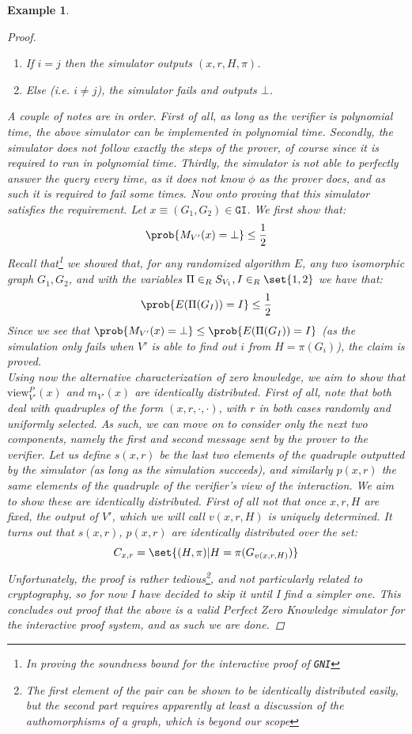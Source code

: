\documentclass{article}
\newtheorem{example}{Example}
\begin{document}
\begin{example}
\begin{proof}
\begin{enumerate}
            \item If $i = j$ then the simulator outputs $(x, r, H, \pi)$.
            \item Else (i.e. $i \neq j$), the simulator fails and outputs $\bot$.
        \end{enumerate}
        A couple of notes are in order. First of all, as long as the verifier is polynomial time, the above simulator can be implemented in polynomial time.
        Secondly, the simulator does not follow exactly the steps of the prover, of course since it is required to run in polynomial time.
        Thirdly, the simulator is not able to perfectly answer the query every time, as it does not know $\phi$ as the prover does, and as such it is required to fail some times.
        Now onto proving that this simulator satisfies the requirement.
        Let $x \equiv (G_1, G_2) \in \texttt{GI}$.
        We first show that:
        \[ \prob{M_{V'}(x) = \bot} \leq \frac{1}{2} \]
        Recall that\footnote{In proving the soundness bound for the interactive proof of \texttt{GNI}} we showed that, for any randomized algorithm $E$, any two isomorphic graph $G_1, G_2$, and with the variables $\Pi \in_R S_{V_1}, I \in_R \set{1, 2}$ we have that:
        \[ \prob{E(\Pi(G_I)) = I} \leq \frac{1}{2} \]
        Since we see that $\prob{M_{V'}(x) = \bot} \leq \prob{E(\Pi(G_I)) = I}$ (as the simulation only fails when $V'$ is able to find out $i$ from $H = \pi(G_i)$), the claim is proved. \\
        Using now the alternative characterization of zero knowledge, we aim to show that $\text{view}^{P}_{V'}(x)$ and $m_{V'}(x)$ are identically distributed.
        First of all, note that both deal with quadruples of the form $(x, r, \cdot, \cdot)$, with $r$  in both cases randomly and uniformly selected. As such, we can move on to consider only the next two components, namely the first and second message sent by the prover to the verifier.
        Let us define $s(x,r)$ be the last two elements of the quadruple outputted by the simulator (as long as the simulation succeeds), and similarly $p(x,r)$ the same elements of the quadruple of the verifier's view of the interaction.
        We aim to show these are identically distributed. First of all not that once $x,r,H$ are fixed, the output of $V'$, which we will call $v(x,r,H)$ is uniquely determined.
        It turns out that $s(x,r)$, $p(x,r)$ are identically distributed over the set:
        \[ C_{x,r} = \set{ (H, \pi) | H = \pi(G_{v(x,r,H)}) } \]
        Unfortunately, the proof is rather tedious\footnote{The first element of the pair can be shown to be identically distributed easily, but the second part requires apparently at least a discussion of the authomorphisms of a graph, which is beyond our scope}, and not particularly related to cryptography, so for now I have decided to skip it until I find a simpler one.
        This concludes out proof that the above is a valid Perfect Zero Knowledge simulator for the interactive proof system, and as such we are done.
    \end{proof}
\end{example}
\end{document}
